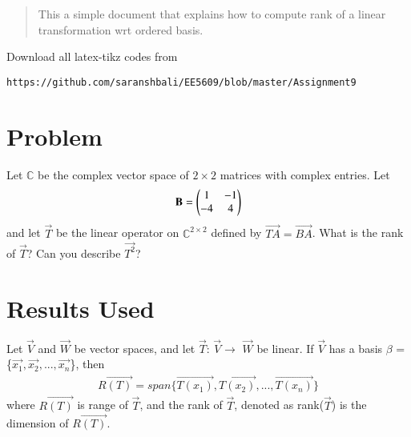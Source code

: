 \documentclass[journal,12pt,twocolumn]{IEEEtran}
\begin{document}
%
\begin{abstract}
This a simple document that explains how to compute rank of a linear transformation wrt ordered basis.
\end{abstract}
%
%
Download all latex-tikz codes from 
%
\begin{lstlisting}
https://github.com/saranshbali/EE5609/blob/master/Assignment9
\end{lstlisting}
%
\section{Problem}
Let $\mathbb{C}$ be the complex vector space of $2\times2$ matrices with complex entries. Let
\begin{align}
	\mathbf{B} = \begin{pmatrix}1 & -1 \\ -4 & 4\end{pmatrix}
\end{align}
and let $\vec{T}$ be the linear operator on $\mathbb{C}^{2\times2}$  defined by $\vec{TA} = \vec{BA}$. What is the rank of $\vec{T}$? Can you describe $\vec{T^2}$?   
\section{Results Used}
\begin{theorem}\label{1}
Let $\vec{V}$ and $\vec{W}$ be vector spaces, and let $\vec{T}$: $\vec{V}$$\to$ $\vec{W}$ be linear. If $\vec{V}$ has a basis $\beta$ = \{$\vec{x_1}, \vec{x_2},...,\vec{x_n}$\}, then
\begin{align}
R\vec{(T)} = span\{\vec{T(x_1)}, \vec{T(x_2)},...,\vec{T(x_n)}\} 
\end{align}
where $R\vec{(T)}$ is range of $\vec{T}$, and the rank of $\vec{T}$, denoted as rank($\vec{T}$) is the dimension of $R\vec{(T)}$. 
\end{theorem}
\end{document}
